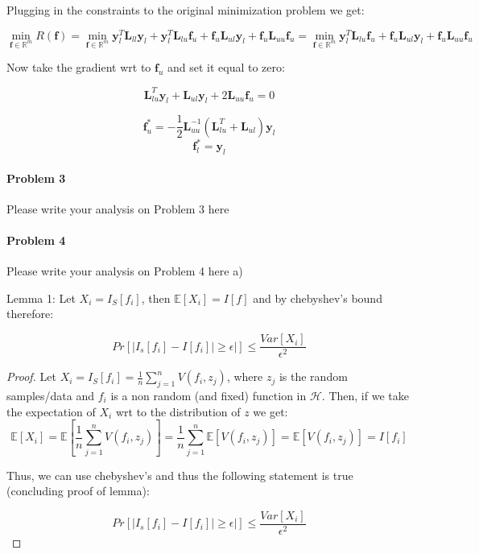 \documentclass[12pt]{report}
\begin{document}
Plugging in the constraints to the original minimization problem we get:

$$ \underset{\mathbf{f} \in \mathbb{R}^m} {\min} R(\mathbf{f}) = 
\underset{\mathbf{f} \in \mathbb{R}^m} {\min} 
\mathbf{y}^T_l\mathbf{L}_{ll}\mathbf{y}_l
+
\mathbf{y}^T_l\mathbf{L}_{lu}\mathbf{f}_u
+
\mathbf{f}_u\mathbf{L}_{ul}\mathbf{y}_l
+
\mathbf{f}_u\mathbf{L}_{uu}\mathbf{f}_u
=
\underset{\mathbf{f} \in \mathbb{R}^m} {\min}
\mathbf{y}^T_l\mathbf{L}_{lu}\mathbf{f}_u
+
\mathbf{f}_u\mathbf{L}_{ul}\mathbf{y}_l
+
\mathbf{f}_u\mathbf{L}_{uu}\mathbf{f}_u
$$

Now take the gradient wrt to $\mathbf{f}_u$ and set it equal to zero:

$$
\mathbf{L}_{lu}^T\mathbf{y}_l
+
\mathbf{L}_{ul}\mathbf{y}_l
+
2\mathbf{L}_{uu}\mathbf{f}_u = 0
$$


$$
\boxed{
\mathbf{f}^*_{u} = -\frac{1}{2} \mathbf{L}_{uu}^{-1} (\mathbf{L}_{lu}^T+\mathbf{L}_{ul})\mathbf{y}_{l}
}
$$
$$
\boxed{
\mathbf{f}^*_{l} = \mathbf{y}_{l}
}
$$

\paragraph{Problem 3}
Please write your analysis on Problem 3 here


\paragraph{Problem 4}
Please write your analysis on Problem 4 here
a)


Lemma 1: Let $X_i = I_S[f_i]$, then $\mathbb{E}[X_i] = I[f]$ and by chebyshev's bound therefore:

$$ Pr[ | I_s[f_i] - I[f_i] | \geq \epsilon|] \leq \frac{ Var[X_i] }{ \epsilon^2 } $$

\begin{proof}
Let $X_i = I_S[f_i] = \frac{1}{n} \sum^{n}_{j=1} V(f_i, z_j)$, where $z_j$ is the random samples/data and $f_i$ is a non random (and fixed) function in $\mathcal{H}$. Then, if we take the expectation of $X_i$ wrt to the distribution of $z$ we get:
$$\mathbb{E}[X_i]  = \mathbb{E}[\frac{1}{n} \sum^{n}_{j=1} V(f_i, z_j)] = \frac{1}{n} \sum^{n}_{j=1} \mathbb{E}[V(f_i, z_j)] =  \mathbb{E}[V(f_i, z_j)] = I[f_i]$$

Thus, we can use chebyshev's and thus the following statement is true (concluding proof of lemma):

$$ Pr[ | I_s[f_i] - I[f_i] | \geq \epsilon|] \leq \frac{ Var[X_i] }{ \epsilon^2 } $$

\end{proof}
\end{document}
